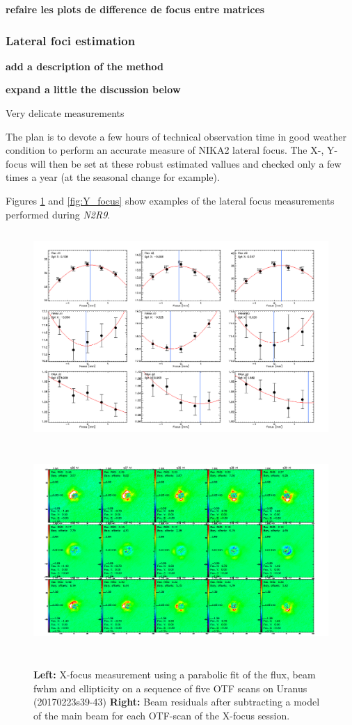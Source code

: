 {\bf refaire les plots de difference de focus entre matrices }


\subsubsection{Lateral foci estimation}
\label{sec:focus_X_Y}

{\bf add a description of the method}

{\bf expand a little the discussion below}

Very delicate measurements

The plan is to devote a few hours of technical observation time in
good weather condition to perform an accurate measure of NIKA2 lateral
focus. The X-, Y-focus will then be set at these robust estimated vallues and
checked only a few times a year (at the seasonal change for example).  


Figures \ref{fig:X_focus} and \ref{fig:Y_focus} show examples of the
lateral focus measurements performed during \emph{N2R9}. 

\begin{figure}[h!]
\centering
\includegraphics[height=8cm]{Figures/plot_20170223s39.png}
\hspace{0.5cm}
\includegraphics[height=8cm]{Figures/residuals_focus_otf_20170223s39.png}
\caption{{\footnotesize \textbf{Left:} X-focus measurement using a
    parabolic fit of the flux, beam fwhm and ellipticity on a sequence
    of five OTF scans on Uranus (20170223s39-43) \textbf{Right:} Beam residuals after subtracting a model of the main beam for each OTF-scan of the X-focus session.}}
\label{fig:X_focus}
\end{figure}


